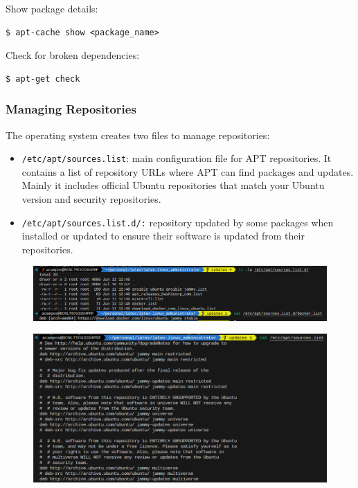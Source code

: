 \documentclass{article}
\newenvironment{codetemplate}[1][]{%
  \mybasecolorbox[#1]
  \itshape
}{%
  \endmybasecolorbox
}
\begin{document}
Show package details:
\begin{codetemplate}
\begin{verbatim}
$ apt-cache show <package_name>
\end{verbatim}
\end{codetemplate}

Check for broken dependencies:
\begin{codetemplate}
\begin{verbatim}
$ apt-get check
\end{verbatim}
\end{codetemplate}

\subsubsection{Managing Repositories}

The operating system creates two files to manage repositories:

\begin{itemize}
    \item \verb|/etc/apt/sources.list|: main configuration file for APT repositories. It contains a list of repository URLs where APT can find packages and updates. Mainly it includes official Ubuntu repositories that match your Ubuntu version and security repositories.
    \item \verb|/etc/apt/sources.list.d/:| repository updated by some packages when installed or updated to ensure their software is updated from their repositories. 
\end{itemize}

\begin{figure}[H]
    \includegraphics[width=\textwidth]{pictures/apt.png}
    \centering
\end{figure}

\begin{figure}[H]
    \includegraphics[width=\textwidth]{pictures/apt2.png}
    \centering
\end{figure}
\end{document}
